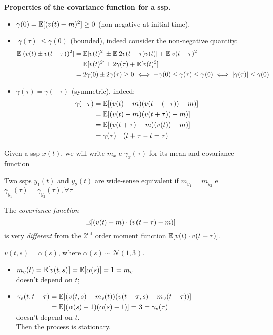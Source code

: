 \textbf{Properties of the covariance function for a \gls{ssp}.}
\begin{itemize}
	\item $\gamma(0)=\mathbb{E}[(v(t)-m)^{2}] \geq 0$ (non negative at initial time).
	\item $|\gamma(\tau)| \leq \gamma(0)$ (bounded), indeed consider the non-negative quantity:
	\begin{align*}
		\mathbb{E}[(v(t) \pm v(t-\tau))^2] &= \mathbb{E}[v(t)^2] \pm \mathbb{E}[2v(t-\tau)v(t)]+\mathbb{E}[v(t-\tau)^2]\\
		&=\mathbb{E}[v(t)^2] \pm 2\gamma(\tau)+\mathbb{E}[v(t)^2]\\
		&=2\gamma(0) \pm 2\gamma(\tau) \geq 0 
		\iff -\gamma(0) \leq \gamma(\tau) \leq \gamma(0) \iff |\gamma(\tau)| \leq \gamma(0)
	\end{align*}
	\item $\gamma(\tau)=\gamma(-\tau)$ (symmetric), indeed:
	\begin{align*}
		\gamma(-\tau)&=\mathbb{E}[(v(t)-m)(v(t-(-\tau))-m)]\\
		&=\mathbb{E}[(v(t)-m)(v(t+\tau))-m)]\\
		&=\mathbb{E}[(v(t+\tau)-m)(v(t))-m)]\\
		&=\gamma(\tau) \quad(t+\tau-t=\tau)
	\end{align*}
\end{itemize}


Given a \gls{ssp} $x(t)$, we will write $m_{x}$ e $\gamma_{x}(\tau)$ for its mean and covariance function

Two \glspl{ssp} $y_{1}(t)$ and $y_{2}(t)$ are wide-sense equivalent if $m_{y_{1}}=m_{y_{2}}$ e $\gamma_{y_{1}}(\tau)=\gamma_{y_{2}}(\tau), \forall \tau$

The \emph{covariance function}
$$
	\mathbb{E}[(v(t)-m) \cdot(v(t-\tau)-m)]
$$
is very \emph{different} from the $2^{\text{nd}}$ order moment function $\mathbb{E}[v(t) \cdot v(t-\tau)]$.

\begin{exa}
$\boxed{v(t,s)=\alpha (s)}$, where $\alpha (s)\sim \mathcal{N}(1,3)$.

\begin{itemize}
	\item $m_{v}(t)=\mathbb{E}[v(t, s)]=\mathbb{E}[\alpha(s)]=1=m_{v}$\\
	doesn't depend on $t$;
	\item $\begin{aligned}[t]
		\gamma_{v}(t, t-\tau)&=\mathbb{E}[(v(t, s)-m_{v}(t))(v(t-\tau, s)-m_{v}(t-\tau))]\\
		&=\mathbb{E}[(\alpha(s)-1)(\alpha(s)-1)]=3=\gamma_{v}(\tau)
	\end{aligned}$\\
	doesn't depend on $t$.\\
	Then the process is stationary.
\end{itemize}
\end{exa}

